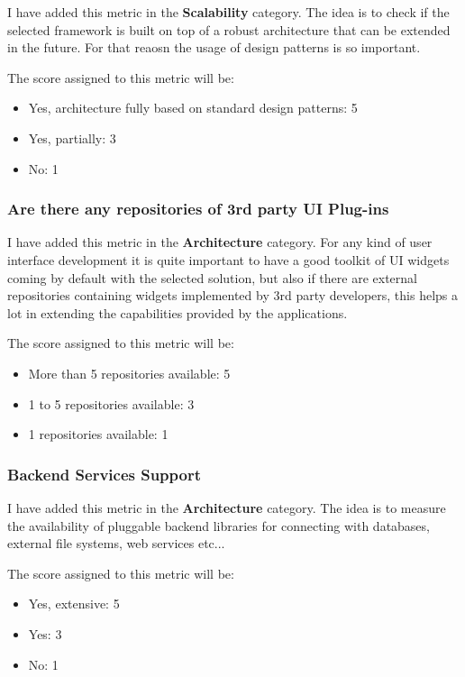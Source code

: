 \documentclass[a4paper,12pt]{book}
\begin{document}
I have added this metric in the \textbf{Scalability} category. The idea is to check if the selected framework is built on top of a robust architecture that can be extended in the future. For that reaosn the usage of design patterns is so important.

The score assigned to this metric will be:
\begin{itemize}
 \item Yes, architecture fully based on standard design patterns: 5
 \item Yes, partially: 3
 \item No: 1
\end{itemize}

\subsubsection{Are there any repositories of 3rd party UI Plug-ins}
\label{Are there any repositories of 3rd party UI Plug-ins}

I have added this metric in the \textbf{Architecture} category. For any kind of user interface development it is quite important to have a good toolkit of UI widgets coming by default with the selected solution, but also if there are external repositories containing widgets implemented by 3rd party developers, this helps a lot in extending the capabilities provided by the applications.

The score assigned to this metric will be:
\begin{itemize}
 \item More than 5 repositories available: 5
 \item 1 to 5 repositories available: 3
 \item 1 repositories available: 1
\end{itemize}

\subsubsection{Backend Services Support}
\label{Backend Services Support}

I have added this metric in the \textbf{Architecture} category. The idea is to measure the availability of pluggable backend libraries for connecting with databases, external file systems, web services etc...

The score assigned to this metric will be:
\begin{itemize}
 \item Yes, extensive: 5
 \item Yes: 3
 \item No: 1
\end{itemize}
\end{document}
